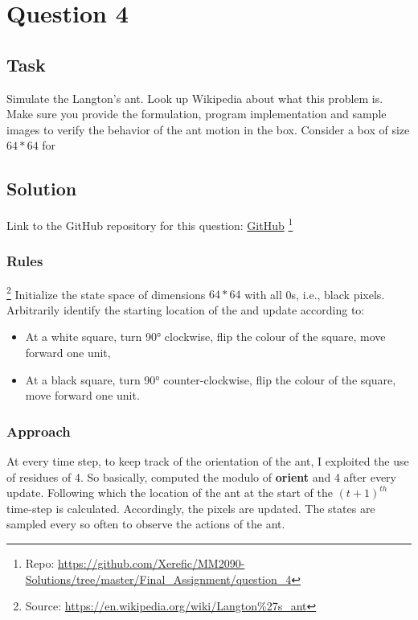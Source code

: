 \section{Question 4}

\subsection{Task}
Simulate the Langton’s ant. Look up Wikipedia about what this problem is. Make sure you provide the formulation, program implementation and sample images to verify the behavior of the ant motion in the box. Consider a box of size $64*64$ for


\subsection{Solution}

Link to the GitHub repository for this question: \href{https://github.com/Xerefic/MM2090-Solutions/tree/master/Final_Assignment/question_4}{GitHub} \footnote{Repo: \url{https://github.com/Xerefic/MM2090-Solutions/tree/master/Final_Assignment/question_4}}

\subsubsection{Rules}\footnote{Source: \url{https://en.wikipedia.org/wiki/Langton\%27s_ant}}
Initialize the state space of dimensions $64*64$ with all 0s, i.e., black pixels. Arbitrarily identify the starting location of the and update according to:
\begin{itemize}
	\item At a white square, turn 90° clockwise, flip the colour of the square, move forward one unit,
	\item At a black square, turn 90° counter-clockwise, flip the colour of the square, move forward one unit.
\end{itemize}

\subsubsection{Approach}
At every time step, to keep track of the orientation of the ant, I exploited the use of residues of 4. So basically, computed the modulo of \textbf{orient} and 4 after every update. Following which the location of the ant at the start of the $\left(t+1\right)^{th}$ time-step is calculated. Accordingly, the pixels are updated. The states are sampled every so often to observe the actions of the ant.



